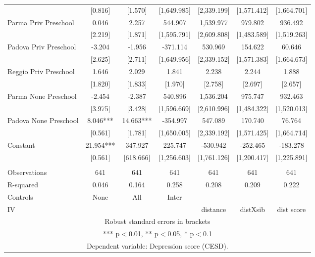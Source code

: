 \begin{tabular}{lcccccc}
 & [0.816] & [1.570] & [1,649.985] & [2,339.199] & [1,571.412] & [1,664.701] \\
Parma Priv Preschool & 0.046 & 2.257 & 544.907 & 1,539.977 & 979.802 & 936.492 \\
 & [2.219] & [1.871] & [1,595.791] & [2,609.808] & [1,483.589] & [1,519.263] \\
Padova Priv Preschool & -3.204 & -1.956 & -371.114 & 530.969 & 154.622 & 60.646 \\
 & [2.625] & [2.711] & [1,649.956] & [2,339.152] & [1,571.383] & [1,664.673] \\
Reggio Priv Preschool & 1.646 & 2.029 & 1.841 & 2.238 & 2.244 & 1.888 \\
 & [1.820] & [1.833] & [1.970] & [2.758] & [2.697] & [2.657] \\
Parma None Preschool & -2.454 & -2.387 & 540.896 & 1,536.204 & 975.747 & 932.463 \\
 & [3.975] & [3.428] & [1,596.669] & [2,610.996] & [1,484.322] & [1,520.013] \\
Padova None Preschool & 8.046*** & 14.663*** & -354.997 & 547.089 & 170.740 & 76.764 \\
 & [0.561] & [1.781] & [1,650.005] & [2,339.192] & [1,571.425] & [1,664.714] \\
Constant & 21.954*** & 347.927 & 225.747 & -530.942 & -252.465 & -183.278 \\
 & [0.561] & [618.666] & [1,256.603] & [1,761.126] & [1,200.417] & [1,225.891] \\
 &  &  &  &  &  &  \\
Observations & 641 & 641 & 641 & 641 & 641 & 641 \\
R-squared & 0.046 & 0.164 & 0.258 & 0.208 & 0.209 & 0.222 \\
Controls & None & All & Inter &  &  &  \\
 IV &  &  &  & distance & distXsib & dist score \\ \hline
\multicolumn{7}{c}{ Robust standard errors in brackets} \\
\multicolumn{7}{c}{ *** p$<$0.01, ** p$<$0.05, * p$<$0.1} \\
\multicolumn{7}{c}{ Dependent variable: Depression score (CESD).} \\
\end{tabular}
